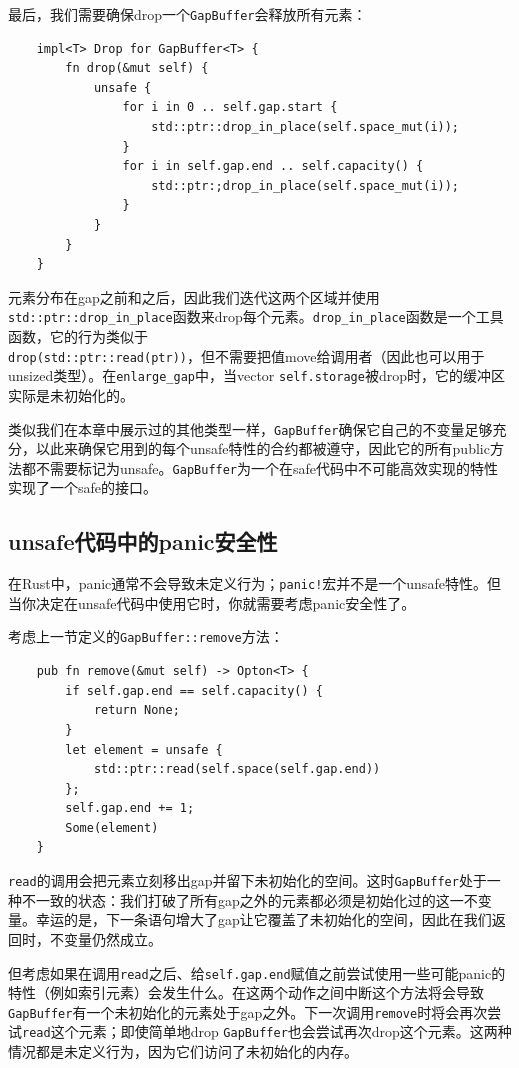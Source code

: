最后，我们需要确保drop一个\texttt{GapBuffer}会释放所有元素：
\begin{verbatim}
    impl<T> Drop for GapBuffer<T> {
        fn drop(&mut self) {
            unsafe {
                for i in 0 .. self.gap.start {
                    std::ptr::drop_in_place(self.space_mut(i));
                }
                for i in self.gap.end .. self.capacity() {
                    std::ptr:;drop_in_place(self.space_mut(i));
                }
            }
        }
    }
\end{verbatim}

元素分布在gap之前和之后，因此我们迭代这两个区域并使用\texttt{std::ptr::drop\_in\_place}函数来drop每个元素。\texttt{drop\_in\_place}函数是一个工具函数，它的行为类似于\\
\texttt{drop(std::ptr::read(ptr))}，但不需要把值move给调用者（因此也可以用于unsized类型）。在\texttt{enlarge\_gap}中，当vector \texttt{self.storage}被drop时，它的缓冲区实际是未初始化的。

类似我们在本章中展示过的其他类型一样，\texttt{GapBuffer}确保它自己的不变量足够充分，以此来确保它用到的每个unsafe特性的合约都被遵守，因此它的所有public方法都不需要标记为unsafe。\texttt{GapBuffer}为一个在safe代码中不可能高效实现的特性实现了一个safe的接口。

\subsection{unsafe代码中的panic安全性}
在Rust中，panic通常不会导致未定义行为；\texttt{panic!}宏并不是一个unsafe特性。但当你决定在unsafe代码中使用它时，你就需要考虑panic安全性了。

考虑上一节定义的\texttt{GapBuffer::remove}方法：
\begin{verbatim}
    pub fn remove(&mut self) -> Opton<T> {
        if self.gap.end == self.capacity() {
            return None;
        }
        let element = unsafe {
            std::ptr::read(self.space(self.gap.end))
        };
        self.gap.end += 1;
        Some(element)
    }
\end{verbatim}

\texttt{read}的调用会把元素立刻移出gap并留下未初始化的空间。这时\texttt{GapBuffer}处于一种不一致的状态：我们打破了所有gap之外的元素都必须是初始化过的这一不变量。幸运的是，下一条语句增大了gap让它覆盖了未初始化的空间，因此在我们返回时，不变量仍然成立。

但考虑如果在调用\texttt{read}之后、给\texttt{self.gap.end}赋值之前尝试使用一些可能panic的特性（例如索引元素）会发生什么。在这两个动作之间中断这个方法将会导致\texttt{GapBuffer}有一个未初始化的元素处于gap之外。下一次调用\texttt{remove}时将会再次尝试\texttt{read}这个元素；即使简单地drop \texttt{GapBuffer}也会尝试再次drop这个元素。这两种情况都是未定义行为，因为它们访问了未初始化的内存。

